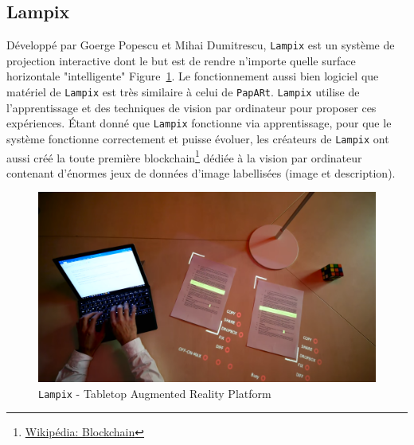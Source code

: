 \subsection{Lampix} 
Développé par Goerge Popescu et Mihai Dumitrescu, \texttt{Lampix} est un système de projection interactive dont le but est de rendre n'importe quelle surface horizontale "intelligente" Figure~\ref{fig:lampix}. Le fonctionnement aussi bien logiciel que matériel de \texttt{Lampix} est très similaire à celui de \texttt{\texttt{PapARt}}. \texttt{Lampix} utilise de l'apprentissage et des techniques de vision par ordinateur pour proposer ces expériences. Étant donné que \texttt{Lampix} fonctionne via apprentissage, pour que le système fonctionne correctement et puisse évoluer, les créateurs de \texttt{Lampix} ont aussi créé la toute première blockchain\footnote{\href{https://fr.wikipedia.org/wiki/Blockchain}{Wikipédia: Blockchain}} dédiée à la vision par ordinateur contenant d'énormes jeux de données d'image labellisées (image et description).
     
\begin{figure}[H]
\centering
\includegraphics[width=0.7\linewidth]{images/lampix}
\caption{\texttt{Lampix} - Tabletop Augmented Reality Platform\protect\footnotemark}
\label{fig:lampix}
\end{figure} 

